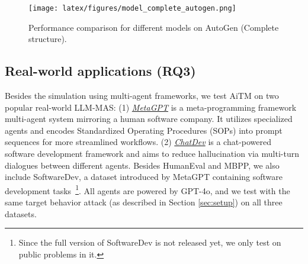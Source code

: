
\begin{figure}[h!]
    \centering
    \texttt{[image: latex/figures/model\_complete\_autogen.png]}\vspace{-0.05in} 
    \caption{Performance comparison for different models on AutoGen (Complete structure).}
    \label{fig:models_autogen}
\end{figure}
\vspace{-0.1in}




\subsection{Real-world applications (RQ3)}

Besides the simulation using multi-agent frameworks, we test AiTM on two popular real-world LLM-MAS: (1) \underline{\textit{MetaGPT}} \citep{hong2023metagpt} is a meta-programming framework multi-agent system mirroring a human software company. It utilizes specialized agents and encodes Standardized Operating Procedures (SOPs) into prompt sequences for more
streamlined workflows. (2) \underline{\textit{ChatDev}} \citep{qian2024chatdev} is a chat-powered software development framework and aims to reduce hallucination via multi-turn dialogues between different agents. Besides HumanEval and MBPP, we also include SoftwareDev, a dataset introduced by MetaGPT containing software development tasks~\footnote{Since the full version of SoftwareDev is not released yet, we only test on public problems in it.}. All agents are powered by GPT-4o, and we test with the same target behavior attack (as described in Section \ref{sec:setup}) on all three datasets.

